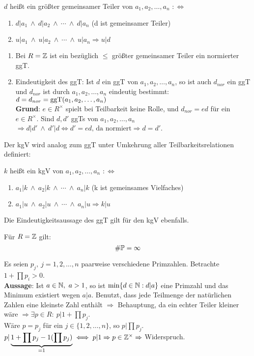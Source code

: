 \documentclass[a4paper,DIV15,BCOR12mm]{article}
\begin{document}
\begin{definition}
    $d$ heißt ein größter gemeinsamer Teiler von
    $a_1,a_2,\dotsc,a_n$ $:\iff$
    \begin{enumerate}
        \item $d|a_1\ \wedge\ d|a_2\ \wedge\ \dotsb \ \wedge\ d|a_n$
        (d ist gemeinsamer Teiler)
        \item $u|a_1\ \wedge\ u|a_2\ \wedge\ \dotsb \ \wedge\ u|a_n \Rightarrow u|d$
    \end{enumerate}
\end{definition}
\begin{bemerkung}
    \begin{enumerate}
        \item Bei $R=\mathbb{Z}$ ist ein bezüglich $\leq$ größter
        gemeinsamer Teiler ein normierter ggT.
        \item Eindeutigkeit des ggT: Ist $d$ ein ggT von
        $a_1,a_2,\dotsc,a_n$, so ist auch $d_{nor}$ ein ggT und $d_{nor}$
        ist durch $a_1,a_2,\dotsc,a_n$ eindeutig bestimmt:
        $d=d_{nor}=\mathop{\rm ggT}\nolimits(a_1,a_2,\dotsc,a_n)$\\
        \textbf{Grund}: $e \in R^{\times}$ spielt bei Teilbarkeit keine Rolle, und
        $d_{nor}=ed$ für ein $e \in R^{\times}$. Sind $d,d'$ ggTs von $a_1,a_2,\dotsc,a_n$
        $\Rightarrow d|d'\ \wedge\ d'|d \iff d'=ed\text{, da
        normiert}\Rightarrow d=d'$.
    \end{enumerate}
\end{bemerkung}
Der kgV wird analog zum ggT unter Umkehrung aller
Teilbarkeitsrelationen definiert:

\begin{definition}
    $k$ heißt ein kgV von $a_1,a_2,\dotsc,a_n$ $:\iff$
        \begin{enumerate}
        \item $a_1|k\ \wedge\ a_2|k\ \wedge\ \dotsb \ \wedge\ a_n|k$
        (k ist gemeinsames Vielfaches)
        \item $a_1|u\ \wedge\ a_2|u\ \wedge\ \dotsb \ \wedge\ a_n|u \Rightarrow k|u$
    \end{enumerate}
\end{definition}
Die Eindeutigkeitsaussage des ggT gilt für den kgV ebenfalls.

\begin{satz}
    Für $R=\mathbb{Z}$ gilt:
    \[\#\mathbb{P}=\infty\]
\end{satz}
\begin{beweis}
    Es seien $p_j,\ j=1,2,\dotsc,n$ paarweise verschiedene Primzahlen.
    Betrachte $1+\prod p_i>0$.\\
    \textbf{Aussage}: Ist $a\in \mathbb{N},\ a > 1$, so ist $\min\{d\in \mathbb{N}:
    d|a\}$ eine Primzahl und das Minimum existiert wegen $a|a$.
    Benutzt, dass jede Teilmenge der natürlichen Zahlen eine
    kleinste Zahl enthält $\Rightarrow$ Behauptung, da ein echter Teiler
    kleiner wäre  $\Rightarrow \exists p \in R:\ p|1+\prod p_j$.\\
    Wäre $p=p_j$ für ein $j\in\{1,2,\dotsc,n\}$, so $p|\prod p_j$.
    $p|\underbrace{1+\prod p_j-1(\prod p_j)}_{=1} \iff p|1
    \Rightarrow p\in \mathbb{Z}^{\times} \Rightarrow$ Widerspruch.
\end{beweis}
\end{document}
